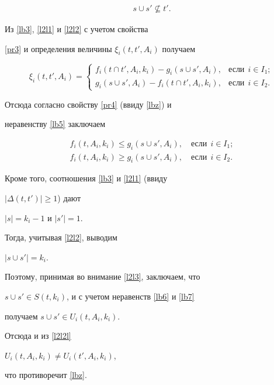 \begin{pf}
\begin{gather}
s\cup s'\nsubseteq t'.


\end{gather}





Из \eqref{lb3}, \eqref{l2l1} и \eqref{l2l2} с учетом свойства


\ref{pr3} и определения величины $\xi_i(t, t', A_i)$ получаем


$$


\xi_i(t, t', A_i)=


\begin{cases}


f_i(t \cap t', A_i, k_i)-g_i( s\cup s', A_i), & \text{если}\ \ i\in I_1;\\


g_i( s\cup s', A_i)-f_i(t \cap t', A_i, k_i), & \text{если}\ \ i \in I_2.


\end{cases}


$$


Отсюда согласно свойству \ref{pr4} (ввиду \eqref{lbz}) и


неравенству \eqref{lb5} заключаем


\begin{gather} \label{lb6}


 f_i(t, A_i, k_i)\leq g_i(s\cup s', A_i),\quad \text{если} \ \ i\in I_1;\\


%


\label{lb7}


 f_i(t, A_i, k_i)\geq g_i(s\cup s', A_i),\quad \text{если} \ \ i\in I_2.


\end{gather}


Кроме того, соотношения \eqref{lb3} и \eqref{l2l1} (ввиду


$|\Delta(t, t')| \geq 1 $) дают


$|s|=k_i-1$ и $|s'|=1$.


Тогда, учитывая \eqref{l2l2}, выводим


$|s \cup s'|=k_i$.


Поэтому, принимая во внимание \eqref{l2l3}, заключаем, что


$s\cup s' \in S(t, k_i)$, и с учетом неравенств \eqref{lb6} и \eqref{lb7}


получаем $s \cup s' \in U_i(t, A_i, k_i)$.


Отсюда и из \eqref{l2l2l}


$U_i(t, A_i, k_i)\neq U_i(t', A_i, k_i)$,


что противоречит \eqref{lbz}.


\end{pf}





